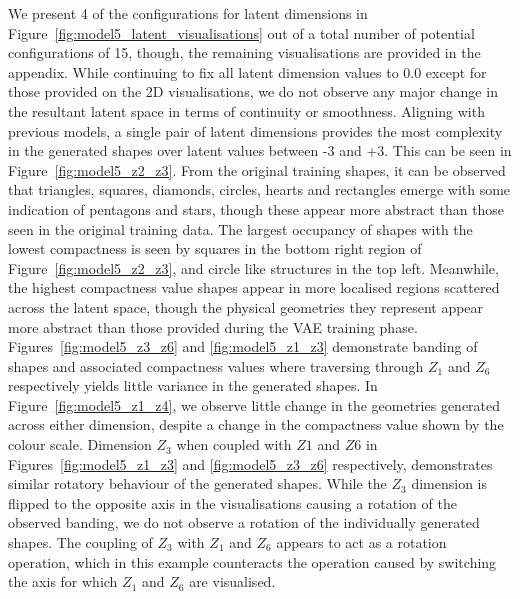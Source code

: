 \documentclass{article}
\begin{document}
We present 4 of the configurations for latent dimensions in Figure~\ref{fig:model5_latent_visualisations} out of a total number of potential configurations of 15, though, the remaining visualisations are provided in the appendix. While continuing to fix all latent dimension values to 0.0 except for those provided on the 2D visualisations, we do not observe any major change in the resultant latent space in terms of continuity or smoothness. Aligning with previous models, a single pair of latent dimensions provides the most complexity in the generated shapes over latent values between -3 and +3. This can be seen in Figure~\ref{fig:model5_z2_z3}. From the original training shapes, it can be observed that triangles, squares, diamonds, circles, hearts and rectangles emerge with some indication of pentagons and stars, though these appear more abstract than those seen in the original training data. The largest occupancy of shapes with the lowest compactness is seen by squares in the bottom right region of Figure~\ref{fig:model5_z2_z3}, and circle like structures in the top left. Meanwhile, the highest compactness value shapes appear in more localised regions scattered across the latent space, though the physical geometries they represent appear more abstract than those provided during the VAE training phase. Figures~\ref{fig:model5_z3_z6} and \ref{fig:model5_z1_z3} demonstrate banding of shapes and associated compactness values where traversing through $Z_1$ and $Z_6$ respectively yields little variance in the generated shapes. In Figure~\ref{fig:model5_z1_z4}, we observe little change in the geometries generated across either dimension, despite a change in the compactness value shown by the colour scale. Dimension $Z_3$ when coupled with $Z1$ and $Z6$ in Figures~\ref{fig:model5_z1_z3} and \ref{fig:model5_z3_z6} respectively, demonstrates similar rotatory behaviour of the generated shapes. While the $Z_3$ dimension is flipped to the opposite axis in the visualisations causing a rotation of the observed banding, we do not observe a rotation of the individually generated shapes. The coupling of $Z_3$ with $Z_1$ and $Z_6$ appears to act as a rotation operation, which in this example counteracts the operation caused by switching the axis for which $Z_1$ and $Z_6$ are visualised. 
\end{document}
